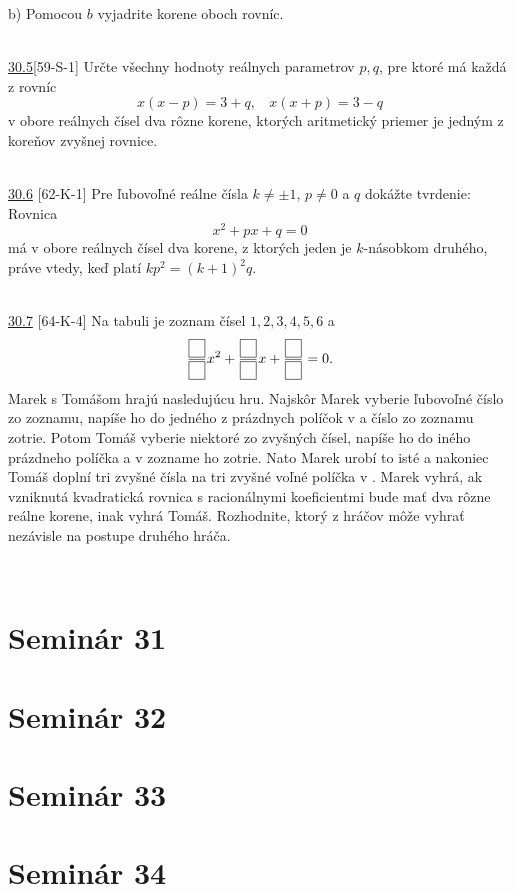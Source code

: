 b) Pomocou $b$ vyjadrite korene oboch rovníc.


\\

\noindent \ul{30.5}[59-S-1] Určte všechny hodnoty reálnych parametrov $p, q$, pre ktoré má každá z rovníc
$$x(x - p) = 3 + q, \ \ \ \ x(x + p) = 3 - q$$
v obore reálnych čísel dva rôzne korene, ktorých aritmetický priemer je jedným z koreňov
zvyšnej rovnice.


\\

\noindent \ul{30.6} [62-K-1] Pre ľubovoľné reálne čísla $k\neq \pm 1$, $p \neq 0$ a $q$ dokážte tvrdenie: Rovnica
$$x^2+ px + q = 0$$
má v obore reálnych čísel dva korene, z ktorých jeden je $k$-násobkom druhého, práve vtedy, keď platí $kp^2 = (k + 1)^2 q$.


\\

\noindent \ul{30.7} [64-K-4]  Na tabuli je zoznam čísel $1, 2, 3, 4, 5, 6$ a 
$$\frac{\fbox{$\phantom{7}$}}{\fbox{$\phantom{7}$}}x^2+\frac{\fbox{$\phantom{7}$}}{\fbox{$\phantom{7}$}}x + \frac{\fbox{$\phantom{7}$}}{\fbox{$\phantom{7}$}}= 0.$$
Marek s Tomášom hrajú nasledujúcu hru. Najskôr Marek vyberie ľubovoľné číslo zo zoznamu, napíše ho do jedného z prázdnych políčok v  a číslo zo zoznamu zotrie. Potom Tomáš vyberie niektoré zo zvyšných čísel, napíše ho do iného prázdneho políčka a v zozname ho zotrie. Nato Marek urobí to isté a nakoniec Tomáš doplní tri zvyšné čísla na tri zvyšné voľné políčka v . Marek vyhrá, ak vzniknutá kvadratická rovnica s racionálnymi koeficientmi bude mať dva rôzne reálne korene, inak vyhrá Tomáš. Rozhodnite, ktorý z hráčov môže vyhrať nezávisle na postupe druhého
hráča.


\\

\section*{Seminár 31}

\section*{Seminár 32}

\section*{Seminár 33}

\section*{Seminár 34}


